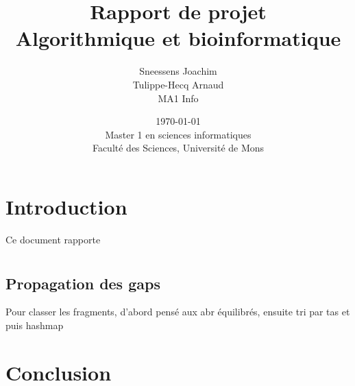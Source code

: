 \documentclass{article}
\title{
{\Huge Rapport de projet}\\
Algorithmique et bioinformatique}
\author{Sneessens Joachim\\Tulippe-Hecq Arnaud\\MA1 Info}
\date{\today\\
Master 1 en sciences informatiques\\
\vspace{1cm}
Faculté des Sciences, Université de Mons}
\begin{document}
\maketitle

\newpage

\section{Introduction}

Ce document rapporte

\section{}


\subsection{Propagation des gaps}

Pour classer les fragments, d'abord pensé aux abr équilibrés, ensuite tri par tas et puis hashmap

\section{Conclusion}
\end{document}
